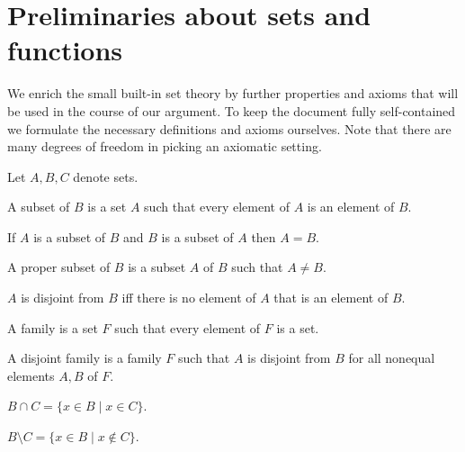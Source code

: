 \documentclass{article}
\begin{document}
\section{Preliminaries about sets and functions}

We enrich the small built-in set theory by further properties and axioms that
will be used in the course of our argument. To keep the document fully
self-contained we formulate the necessary definitions and axioms ourselves.
Note that there are many degrees of freedom in picking an axiomatic setting.

\begin{forthel}
    Let $A,B,C$ denote sets.

    \begin{definition}
        A subset of $B$ is a set $A$ such that
        every element of $A$ is an element of $B$.
    \end{definition}

    \begin{axiom}[Extensionality]
        If $A$ is a subset of $B$ and
        $B$ is a subset of $A$ then $A = B$.
    \end{axiom}

    \begin{definition}
        A proper subset of $B$ is a subset $A$ of $B$ such that $A\neq B$.
    \end{definition}

    \begin{definition}
        $A$ is disjoint from $B$ iff there is no element of $A$ that is an element of $B$.
    \end{definition}

    \begin{definition}
        A family is a set $F$ such that every element of $F$ is a set.
    \end{definition}

    \begin{definition}
        A disjoint family is a family $F$ such that
        $A$ is disjoint from $B$ for all nonequal elements $A, B$ of $F$.
    \end{definition}

    \begin{definition}
        $B \cap C = \{ x \in B \mid x \in C\}$.
    \end{definition}

    \begin{definition}
        $B \setminus C = \{ x \in B \mid x \notin C\}$.
    \end{definition}
\end{forthel}
\end{document}
